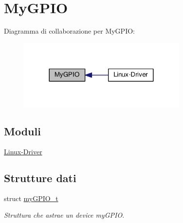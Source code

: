 \hypertarget{group__my_g_p_i_o}{\section{My\+G\+P\+I\+O}
\label{group__my_g_p_i_o}
}
Diagramma di collaborazione per My\+G\+P\+I\+O\+:\nopagebreak
\begin{figure}[H]
\begin{center}
\leavevmode
\includegraphics[width=240pt]{group__my_g_p_i_o}
\end{center}
\end{figure}
\subsection*{Moduli}
\begin{DoxyCompactItemize}
\item 
\hyperlink{group___linux-_driver}{Linux-\/\+Driver}
\end{DoxyCompactItemize}
\subsection*{Strutture dati}
\begin{DoxyCompactItemize}
\item 
struct \hyperlink{structmy_g_p_i_o__t}{my\+G\+P\+I\+O\+\_\+t}
\begin{DoxyCompactList}\small\item\em Struttura che astrae un device my\+G\+P\+I\+O. \end{DoxyCompactList}\end{DoxyCompactItemize}
